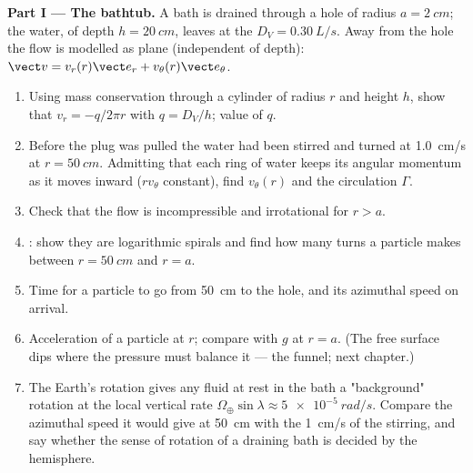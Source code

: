\begin{problem}
\label{pb:b2:fluid-kinematics:1}

\medskip
\noindent\textbf{Part I --- The bathtub.}
A bath is drained through a hole of radius $a = \qty{2}{cm}$; the water,
of depth $h = \qty{20}{cm}$, leaves at the  $D_V =
\qty{0.30}{L/s}$. Away from the hole the flow is modelled as plane
(independent of depth): $\vect v = v_r(r)\vect e_r + v_\theta(r)\vect e_\theta$.
\begin{enumerate}
  \item Using mass conservation through a cylinder of radius $r$ and
        height $h$, show that $v_r = -q/2\pi r$ with $q = D_V/h$;
        value of $q$.
  \item Before the plug was pulled the water had been stirred and
        turned at \qty{1.0}{cm/s} at $r = \qty{50}{cm}$. Admitting that
        each ring of water keeps its angular momentum as it moves
        inward ($rv_\theta$ constant), find $v_\theta(r)$ and the
        circulation $\Gamma$.
  \item Check that the flow is incompressible and irrotational for
        $r > a$.
  \item {}: show they are logarithmic spirals and find how
        many turns a particle makes between $r = \qty{50}{cm}$ and
        $r = a$.
  \item Time for a particle to go from \qty{50}{cm} to the hole, and
        its azimuthal speed on arrival.
  \item Acceleration of a particle at $r$; compare with $g$ at $r = a$.
        (The free surface dips where the pressure must balance it ---
        the funnel; next chapter.)
  \item The Earth's rotation gives any fluid at rest in the bath a
        "background" rotation at the local vertical rate
        $\Omega_\oplus\sin\lambda \approx \qty{5e-5}{rad/s}$. Compare the
        azimuthal speed it would give at \qty{50}{cm} with the
        \qty{1}{cm/s} of the stirring, and say whether the sense of
        rotation of a draining bath is decided by the hemisphere.
\end{enumerate}


\end{problem}
